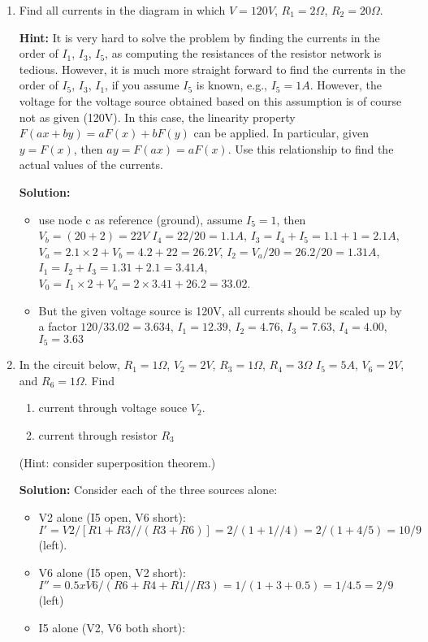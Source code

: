 \begin{enumerate}
\begin{enumerate}
\item
Find all currents in the diagram in which $V=120V$, $R_1=2\Omega$, 
$R_2=20\Omega$. 

{\bf Hint:} It is very hard to solve the problem by finding the currents in 
the order of $I_1$, $I_3$, $I_5$, as computing the resistances of the resistor 
network is tedious. However, it is much more straight forward to find the 
currents in the order of $I_5$, $I_3$, $I_1$, if you assume $I_5$ is known, 
e.g., $I_5=1A$. However, the voltage for the voltage source obtained based 
on this assumption is of course not as given (120V). In this case, the 
linearity property $F(ax+by)=aF(x)+bF(y)$ can be applied. In particular, 
given $y=F(x)$, then $ay=F(ax)=aF(x)$. Use this relationship to find the
actual values of the currents.


{\bf Solution:}
\begin{itemize}
\item use node c as reference (ground), assume $I_5=1$, then $V_b=(20+2)=22V$
$I_4=22/20=1.1A$, $I_3=I_4+I_5=1.1+1=2.1A$, $V_a=2.1\times 2+V_b=4.2+22=26.2V$,
$I_2=V_a/20=26.2/20=1.31A$, $I_1=I_2+I_3=1.31+2.1=3.41A$, 
$V_0=I_1\times 2+V_a=2\times 3.41+26.2=33.02$.
\item But the given voltage source is 120V, all currents should be scaled 
up by a factor $120/33.02=3.634$, $I_1=12.39$, $I_2=4.76$, $I_3=7.63$,
$I_4=4.00$, $I_5=3.63$
\end{itemize}

\item In the circuit below, $R_1=1\Omega$, $V_2=2V$, $R_3=1\Omega$, $R_4=3\Omega$
$I_5=5A$, $V_6=2V$, and $R_6=1\Omega$. Find
\begin{enumerate}
\item current through voltage souce $V_2$. 
\item current through resistor $R_3$
\end{enumerate}
(Hint: consider superposition theorem.)


{\bf Solution:}
Consider each of the three sources alone:
\begin{itemize}
\item V2 alone (I5 open, V6 short): 
$I'=V2/[R1+R3//(R3+R6)]=2/(1+1//4)=2/(1+4/5)=10/9$ (left).
\item V6 alone (I5 open, V2 short): 
$I'' =0.5 x V6/(R6+R4+R1//R3)=1/(1+3+0.5)=1/4.5=2/9$ (left)
\item I5 alone (V2, V6 both short): 


\end{itemize}
\end{enumerate}
\end{enumerate}
